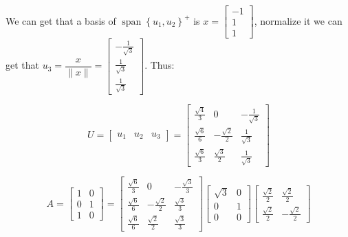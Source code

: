 We can get that a basis of $\operatorname{span}\left\{u_1, u_2\right\}^{+}$ is $x=\left[\begin{array}{c}-1 \\ 1 \\ 1\end{array}\right]$, normalize it we can get that $u_3=\dfrac{x}{\|x\|}=\left[\begin{array}{c}-\frac{1}{\sqrt{3}} \\ \frac{1}{\sqrt{3}} \\ \frac{1}{\sqrt{3}}\end{array}\right]$. Thus:

$$
U=\left[\begin{array}{lll}
u_1 & u_2 & u_3
\end{array}\right]=\left[\begin{array}{ccc}
\frac{\sqrt{4}}{3} & 0 & -\frac{1}{\sqrt{3}} \\
\frac{\sqrt{6}}{6} & -\frac{\sqrt{2}}{2} & \frac{1}{\sqrt{3}} \\
\frac{\sqrt{6}}{3} & \frac{\sqrt{3}}{2} & \frac{1}{\sqrt{3}}
\end{array}\right]
$$

$$A=\begin{bmatrix}1&0\\0&1\\1&0\end{bmatrix}=\begin{bmatrix}\frac{\sqrt{6}}{3}&0&-\frac{\sqrt{3}}{3}\\\frac{\sqrt{6}}{6}&-\frac{\sqrt{2}}{2}&\frac{\sqrt{3}}{3}\\\frac{\sqrt{6}}{6}&\frac{\sqrt{2}}{2}&\frac{\sqrt{3}}{3}\end{bmatrix}\begin{bmatrix}\sqrt{3}&0\\0&1\\0&0\end{bmatrix}\begin{bmatrix}\frac{\sqrt{2}}{2}&\frac{\sqrt{2}}{2}\\\frac{\sqrt{2}}{2}&-\frac{\sqrt{2}}{2}\end{bmatrix}$$

\newpage